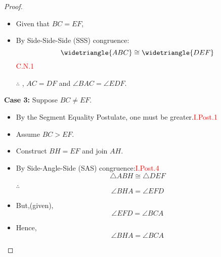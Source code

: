 \begin{proof}
\begin{itemize}
  \item Given that $BC = EF$,
  
  \item By Side-Side-Side (SSS) congruence:
   \[ \widetriangle{ABC} \cong \widetriangle{DEF}\]\hfill\textcolor{red}{C.N.1}
 
  \item[$\therefore$], $AC = DF$ and $\angle BAC = \angle EDF$.
  
\end{itemize}

\textbf{Case 3:} Suppose $BC \neq EF$.

\begin{itemize}

  \item By the Segment Equality Postulate, one must be greater.\hfill\textcolor{red}{I.Post.1}
 
  \item Assume $BC > EF$.
 
  \item Construct $BH = EF$ and join $AH$.
 
 \begin{figure}[H]
	\begin{subfigure}{0.35\textwidth}
		\caption{}
	\end{subfigure}
	\begin{subfigure}{0.35\textwidth}
		\caption{}
	\end{subfigure}
	\caption{}
\end{figure}
 
  \item By Side-Angle-Side (SAS) congruence:\hfill\textcolor{red}{I.Post.4}
   \[\triangle{ABH} \cong \triangle{DEF}\]
  
  \item[$\therefore$]
  \[\angle{BHA} = \angle{EFD}\] 
  
  \item But,(given),
   \[\angle{EFD} = \angle{BCA}\] 
  
  \item Hence, 
  \[\angle{BHA} = \angle{BCA}\]
  

\end{itemize}
\end{proof}

